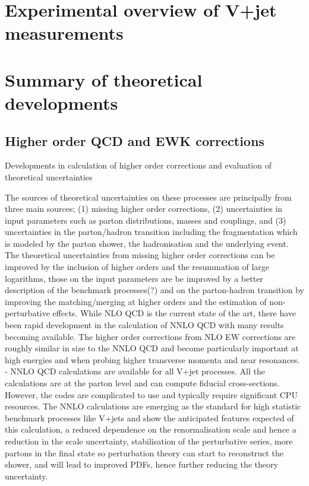 \documentclass[a4paper,11pt,notoc]{article}
\begin{document}
\section{Experimental overview of V+jet measurements}

\section{Summary of theoretical developments}
\subsection{Higher order QCD and EWK corrections}
Developments in calculation of higher order corrections and evaluation of theoretical uncertainties

The sources of theoretical uncertainties on these processes are principally from three main sources; (1) missing higher order corrections, (2) uncertainties in input parameters such as parton distributions, masses and couplings, and (3) uncertainties in the parton/hadron transition including the fragmentation which is modeled by the parton shower, the hadronisation and the underlying event. 
The theoretical uncertainties from missing higher order corrections can be improved by the inclusion of higher orders and the resummation of large logarithms, those on the input parameters are be improved by a better description of the benchmark processes(?) and on the parton-hadron transition by improving the matching/merging at higher orders and the estimation of non-perturbative effects. While NLO QCD is the current state of the art, there have been rapid development in the calculation of NNLO QCD with many results becoming available. The higher order corrections from NLO EW corrections are roughly similar in size to the NNLO QCD and become particularly important at high energies and when probing higher transverse momenta and near resonances. 
- NNLO QCD calculations are available for all V+jet processes. All the calculations are at the parton level and can compute fiducial cross-sections. However, the codes are complicated to use and typically require significant CPU resources. The NNLO calculations are emerging as the standard for high statistic benchmark processes like V+jets and show the anticipated features expected of this calculation, a reduced dependence on the renormalisation scale and hence a reduction in the scale uncertainty, stabilisation of the perturbative series, more partons in the final state so perturbation theory can start to reconstruct the shower, and will lead to improved PDFs, hence further reducing the theory uncertainty. 
\end{document}
